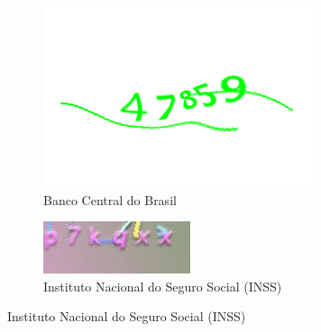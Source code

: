 \begin{figure}[ht]
	\caption{Diferentes CPATCHAs de texto em uso por instituições brasileiras.}
	\label{captchasbrasil}
	\begin{subfigure}[t]{.475\textwidth}
		\centering
		\includegraphics[width=.9\linewidth, height=.4\linewidth]{figuras/captcha_banco_central.png}
		\caption{Banco Central do Brasil}
	\end{subfigure}
	\hspace{.05\textwidth}
	\begin{subfigure}[t]{.475\textwidth}
		\centering
		\includegraphics[width=.9\linewidth, height=.4\linewidth]{figuras/captcha_inss.jpeg}
		\caption{Instituto Nacional do Seguro Social (INSS)}
	\end{subfigure}%
	

\end{figure}

